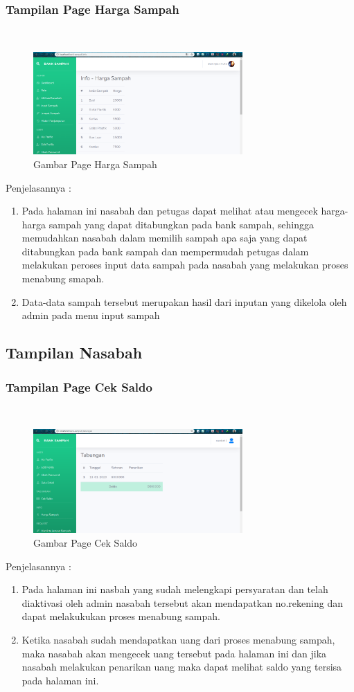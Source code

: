 \subsubsection{Tampilan Page Harga Sampah}
\hfill\\
	\begin{figure}[H]
		\includegraphics[width=8cm]{figures/analisis/27.png}
		\centering
		\caption{Gambar Page Harga Sampah}
	\end{figure}
Penjelasannya :
\begin{enumerate}
\item Pada halaman ini nasabah dan petugas dapat melihat atau mengecek harga-harga sampah yang dapat ditabungkan pada bank sampah, sehingga memudahkan nasabah dalam memilih sampah apa saja yang dapat ditabungkan pada bank sampah dan mempermudah petugas dalam melakukan peroses input data sampah pada nasabah yang melakukan proses menabung smapah.
\item Data-data sampah tersebut merupakan hasil dari inputan yang dikelola oleh admin pada menu input sampah 

\end{enumerate}
	

\subsection{Tampilan Nasabah}
\subsubsection{Tampilan Page Cek Saldo}
\hfill\\
	\begin{figure}[H]
		\includegraphics[width=8cm]{figures/analisis/28.png}
		\centering
		\caption{Gambar Page Cek Saldo}
	\end{figure}
Penjelasannya :
\begin{enumerate}
\item Pada halaman ini nasbah yang sudah melengkapi persyaratan dan telah diaktivasi oleh admin nasabah tersebut akan mendapatkan no.rekening dan dapat melakukukan proses menabung sampah.
\item Ketika nasabah sudah mendapatkan uang dari proses menabung sampah, maka nasabah akan mengecek uang tersebut pada halaman ini dan jika nasabah melakukan penarikan uang maka dapat melihat saldo yang tersisa pada halaman ini.
\end{enumerate}
	
